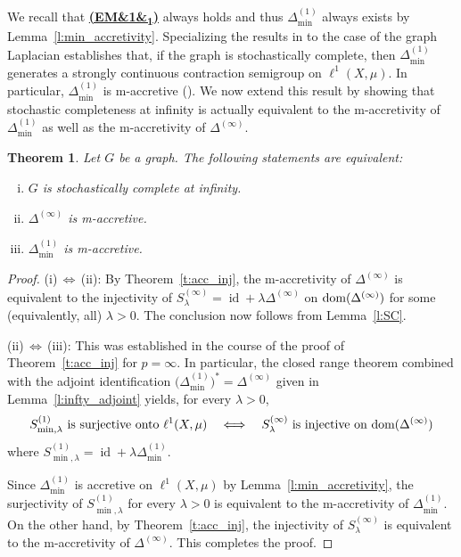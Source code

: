 \documentclass[letterpaper]{article}
\newtheorem{theorem}[lemma]{Theorem}
\theoremstyle{definition}
\theoremstyle{named}
\numberwithin{equation}{section}
\newcommand{\EM}[1][]{\hyperlink{ass:EM}{\textup{\textbf{(EM\ifx&#1&\else\textsubscript{#1}\fi)}}}}
\newcommand{\dom}{\textnormal{dom}} %
\newcommand{\id}{\operatorname{id}}
\newcommand{\deltam}{\Delta_{\min}}
\begin{document}
We recall that \EM[1] always holds and thus $\deltam^{(1)}$
always exists by Lemma~\ref{l:min_accretivity}.
Specializing the results  in \cite{milatovic2015maximal} to the case of the graph Laplacian establishes that, if the graph
is stochastically complete, then $\Delta_{\min}^{(1)}$ generates a strongly continuous contraction semigroup on $\ell^1(X,\mu)$. In particular, $\Delta_{\min}^{(1)}$ is m-accretive (\cite[Theorem 2.11]{milatovic2015maximal}). 
We now extend this result by showing that stochastic completeness at infinity is actually equivalent to the m-accretivity of $\Delta_{\min}^{(1)}$
as well as the m-accretivity of $\Delta^{(\infty)}$.
\begin{theorem}\label{thm:stoch_comp_maccr}
Let $G$ be a graph. The following statements are equivalent:
\begin{enumerate}[(i)]
    \item[\textup{(i)}] $G$ is stochastically complete at infinity.
     \item[\textup{(ii)}] $\Delta^{(\infty)}$ is m-accretive.
    \item[\textup{(iii)}] $\Delta^{(1)}_{\min}$ is m-accretive.
\end{enumerate}
\end{theorem}
\begin{proof}
(i)\,$\Longleftrightarrow$\,(ii): 
By Theorem~\ref{t:acc_inj}, the m-accretivity of $\Delta^{(\infty)}$ is equivalent to the injectivity of $S^{(\infty)}_\lambda=\id+\lambda\Delta^{(\infty)}$
on $\dom(\Delta^{(\infty)})$ 
for some (equivalently, all) $\lambda>0$. 
The conclusion now follows from Lemma~\ref{l:SC}.

(ii)\,$\Longleftrightarrow$\,(iii): 
This was established in the course of the proof of 
Theorem~\ref{t:acc_inj} for $p=\infty$. 
In particular, the closed range theorem combined with the adjoint identification $\bigl(\Delta_{\min}^{(1)}\bigr)^{\ast}=\Delta^{(\infty)}$ given in Lemma~\ref{l:infty_adjoint} yields, for every $\lambda>0$,
\[
S^{(1)}_{\min, \lambda} \text{ is surjective onto } \ell^1(X,\mu)
\quad\Longleftrightarrow\quad
S^{(\infty)}_\lambda \text{ is injective on } \dom(\Delta^{(\infty)})
\]
where $S^{(1)}_{\min, \lambda}=\id+\lambda\Delta_{\min}^{(1)}$. 

Since $\Delta_{\min}^{(1)}$ is accretive on $\ell^1(X,\mu)$ by Lemma~\ref{l:min_accretivity}, 
the surjectivity of $S^{(1)}_{\min, \lambda}$ for every $\lambda>0$ is equivalent to the m-accretivity of $\Delta_{\min}^{(1)}$. 
On the other hand, by Theorem~\ref{t:acc_inj}, the injectivity of $S^{(\infty)}_\lambda$ is equivalent to the m-accretivity of $\Delta^{(\infty)}$. This completes the proof.
\end{proof}
\end{document}
